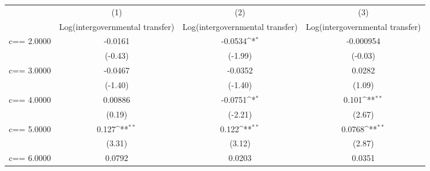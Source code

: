
\def\sym#1{\ifmmode^{#1}\else\(^{#1}\)\fi}
\begin{tabular}{l*{3}{c}}
    \hline\hline
                                  & \multicolumn{1}{c}{(1)}                             & \multicolumn{1}{c}{(2)}                             & \multicolumn{1}{c}{(3)}                             \\
                                  & \multicolumn{1}{c}{Log(intergovernmental transfer)} & \multicolumn{1}{c}{Log(intergovernmental transfer)} & \multicolumn{1}{c}{Log(intergovernmental transfer)} \\
    \hline
    c==     2.0000                & -0.0161                                             & -0.0534\sym{*}                                      & -0.000954                                           \\
                                  & (-0.43)                                             & (-1.99)                                             & (-0.03)                                             \\
    [1em]
    c==     3.0000                & -0.0467                                             & -0.0352                                             & 0.0282                                              \\
                                  & (-1.40)                                             & (-1.40)                                             & (1.09)                                              \\
    [1em]
    c==     4.0000                & 0.00886                                             & -0.0751\sym{*}                                      & 0.101\sym{**}                                       \\
                                  & (0.19)                                              & (-2.21)                                             & (2.67)                                              \\
    [1em]
    c==     5.0000                & 0.127\sym{**}                                       & 0.122\sym{**}                                       & 0.0768\sym{**}                                      \\
                                  & (3.31)                                              & (3.12)                                              & (2.87)                                              \\
    [1em]
    c==     6.0000                & 0.0792                                              & 0.0203                                              & 0.0351                                              \\

\end{tabular}
